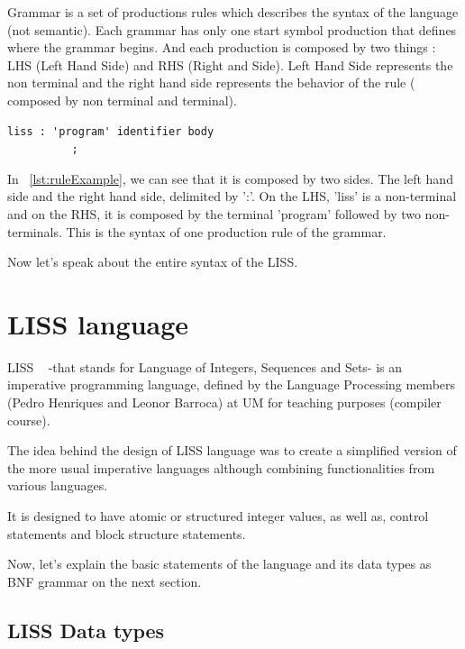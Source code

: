 \documentclass[
  oneside,
  11pt, a4paper,
  footinclude=true,
  headinclude=true,
  cleardoublepage=empty
]{scrbook}
\begin{document}
Grammar is a set of productions rules which describes the syntax of the language (not semantic). Each grammar has only one start symbol production that defines where the grammar begins.
And each production is composed by two things : LHS (Left Hand Side) and RHS (Right and Side). Left Hand Side represents the non terminal and the right hand side represents the behavior of the rule ( composed by non terminal and terminal).

\begin{lstlisting}[caption={A rule production},label={lst:ruleExample}]
     liss : 'program' identifier body
          ;
\end{lstlisting}

In ~\ref{lst:ruleExample}, we can see that it is composed by two sides. The left hand side and the right hand side, delimited by ':'.
On the LHS, 'liss' is a non-terminal and on the RHS, it is composed by the terminal 'program' followed by two non-terminals.
This is the syntax of one production rule of the grammar.

Now let's speak about the entire syntax of the LISS.

\chapter{LISS language}

LISS ~\citep{CH07a} -that stands for Language of Integers, Sequences and Sets- is an imperative programming language, defined by the Language Processing members (Pedro Henriques and Leonor Barroca) at UM for teaching purposes (compiler course).

The idea behind the design of LISS language was to create a simplified version of the more usual imperative languages although combining functionalities from various languages.

It is designed to have atomic or structured integer values, as well as, control statements and block structure statements.

Now, let's explain the basic statements of the language and its data types as BNF grammar on the next section.

\section{LISS Data types}
\label{sec:data_types}
\end{document}
